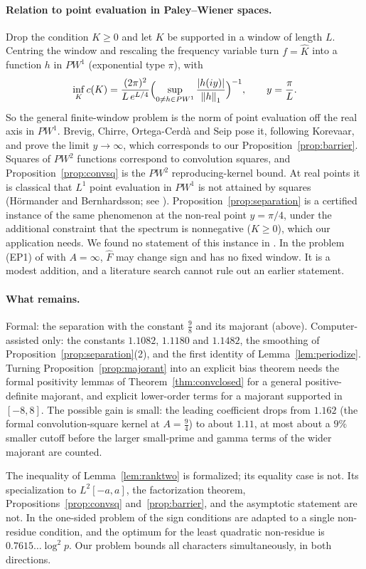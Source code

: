 \paragraph{Relation to point evaluation in Paley--Wiener spaces.}
Drop the condition $K\ge0$ and let $K$ be supported in a window of length $L$. Centring the window and rescaling the frequency
variable turn $f=\hat K$ into a function $h$ in $PW^1$ (exponential type $\pi$), with
\[
  \inf_K c(K)=\frac{(2\pi)^2}{L\,e^{L/4}}\Bigl(\sup_{0\ne h\in PW^1}\frac{\left\lvert h(iy) \right\rvert}{\left\lVert h \right\rVert_1}\Bigr)^{-1},\qquad y=\frac\pi L .
\]
So the general finite-window problem is the norm of point evaluation off the real axis in $PW^1$. Brevig, Chirre, Ortega-Cerd\`a and
Seip \cite[\S9.2]{bcos2024} pose it, following Korevaar, and prove the limit $y\to\infty$, which corresponds to our Proposition~\ref{prop:barrier}.
Squares of $PW^2$ functions correspond to convolution squares, and Proposition~\ref{prop:convsq} is the $PW^2$ reproducing-kernel bound. At
real points it is classical that $L^1$ point evaluation in $PW^1$ is not attained by squares (Hörmander and Bernhardsson; see
\cite{bcos2024}). Proposition~\ref{prop:separation} is a certified instance of the same phenomenon at the non-real point $y=\pi/4$, under
the additional constraint that the spectrum is nonnegative ($K\ge0$), which our application needs. We found no statement of this
instance in \cite{bcos2024,cmqr2024,lls2015}. In the problem (EP1) of \cite{cmqr2024} with $A=\infty$, $\hat F$ may change sign and has no fixed
window. It is a modest addition, and a literature search cannot rule out an earlier statement.

\paragraph{What remains.}
Formal: the separation with the constant $\frac98$ and its majorant (above). Computer-assisted only: the constants $1.1082$, $1.1180$ and
$1.1482$, the smoothing of Proposition~\ref{prop:separation}(2), and the first identity of Lemma~\ref{lem:periodize}. Turning Proposition~\ref{prop:majorant} into an explicit bias theorem needs the formal positivity lemmas of
Theorem~\ref{thm:convclosed} for a general positive-definite majorant, and explicit lower-order terms for a majorant supported in
$[-8,8]$. The possible gain is small: the leading coefficient drops from $1.162$ (the formal convolution-square kernel at $A=\frac94$) to
about $1.11$, at most about a $9\%$ smaller cutoff before the larger small-prime and gamma terms of the wider majorant are counted.

\begin{remark}
The inequality of Lemma~\ref{lem:ranktwo} is formalized; its equality case is not. Its specialization to $L^2[-a,a]$, the factorization theorem, Propositions~\ref{prop:convsq}
and~\ref{prop:barrier}, and the asymptotic statement are not. In the one-sided problem of \cite{cmqr2024} the sign conditions are
adapted to a single non-residue condition, and the optimum for the least quadratic non-residue is $0.7615\ldots\log^2p$. Our problem
bounds all characters simultaneously, in both directions.
\end{remark}
